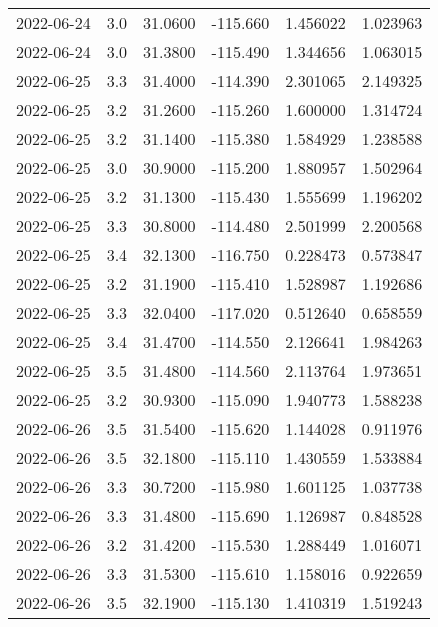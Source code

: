 \begin{tabular}{lrrrrr}
2022-06-24 &       3.0 &  31.0600 &  -115.660 &         1.456022 &         1.023963 \\
2022-06-24 &       3.0 &  31.3800 &  -115.490 &         1.344656 &         1.063015 \\
2022-06-25 &       3.3 &  31.4000 &  -114.390 &         2.301065 &         2.149325 \\
2022-06-25 &       3.2 &  31.2600 &  -115.260 &         1.600000 &         1.314724 \\
2022-06-25 &       3.2 &  31.1400 &  -115.380 &         1.584929 &         1.238588 \\
2022-06-25 &       3.0 &  30.9000 &  -115.200 &         1.880957 &         1.502964 \\
2022-06-25 &       3.2 &  31.1300 &  -115.430 &         1.555699 &         1.196202 \\
2022-06-25 &       3.3 &  30.8000 &  -114.480 &         2.501999 &         2.200568 \\
2022-06-25 &       3.4 &  32.1300 &  -116.750 &         0.228473 &         0.573847 \\
2022-06-25 &       3.2 &  31.1900 &  -115.410 &         1.528987 &         1.192686 \\
2022-06-25 &       3.3 &  32.0400 &  -117.020 &         0.512640 &         0.658559 \\
2022-06-25 &       3.4 &  31.4700 &  -114.550 &         2.126641 &         1.984263 \\
2022-06-25 &       3.5 &  31.4800 &  -114.560 &         2.113764 &         1.973651 \\
2022-06-25 &       3.2 &  30.9300 &  -115.090 &         1.940773 &         1.588238 \\
2022-06-26 &       3.5 &  31.5400 &  -115.620 &         1.144028 &         0.911976 \\
2022-06-26 &       3.5 &  32.1800 &  -115.110 &         1.430559 &         1.533884 \\
2022-06-26 &       3.3 &  30.7200 &  -115.980 &         1.601125 &         1.037738 \\
2022-06-26 &       3.3 &  31.4800 &  -115.690 &         1.126987 &         0.848528 \\
2022-06-26 &       3.2 &  31.4200 &  -115.530 &         1.288449 &         1.016071 \\
2022-06-26 &       3.3 &  31.5300 &  -115.610 &         1.158016 &         0.922659 \\
2022-06-26 &       3.5 &  32.1900 &  -115.130 &         1.410319 &         1.519243 \\

\end{tabular}
